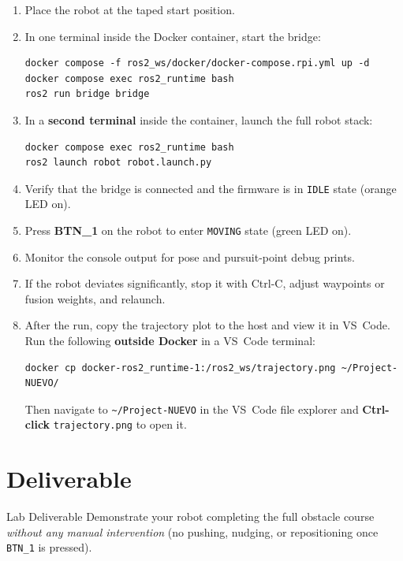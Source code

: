 \documentclass[12pt,letterpaper]{article}
\begin{document}
\begin{enumerate}
  \item Place the robot at the taped start position.
  \item In one terminal inside the Docker container, start the bridge:
\begin{lstlisting}[style=bash]
docker compose -f ros2_ws/docker/docker-compose.rpi.yml up -d
docker compose exec ros2_runtime bash
ros2 run bridge bridge
\end{lstlisting}
  \item In a \textbf{second terminal} inside the container, launch the full
        robot stack:
\begin{lstlisting}[style=bash]
docker compose exec ros2_runtime bash
ros2 launch robot robot.launch.py
\end{lstlisting}
  \item Verify that the bridge is connected and the firmware is in
        \texttt{IDLE} state (orange LED on).
  \item Press \textbf{BTN\_1} on the robot to enter \texttt{MOVING} state
        (green LED on).
  \item Monitor the console output for pose and pursuit-point debug prints.
  \item If the robot deviates significantly, stop it with Ctrl-C, adjust
        waypoints or fusion weights, and relaunch.
  \item After the run, copy the trajectory plot to the host and view it in
        VS~Code.  Run the following \textbf{outside Docker} in a VS~Code
        terminal:
\begin{lstlisting}[style=bash]
docker cp docker-ros2_runtime-1:/ros2_ws/trajectory.png ~/Project-NUEVO/
\end{lstlisting}
        Then navigate to \texttt{\textasciitilde/Project-NUEVO} in the
        VS~Code file explorer and \textbf{Ctrl-click} \texttt{trajectory.png}
        to open it.
\end{enumerate}

\newpage

\section{Deliverable}

\begin{taskbox}{Lab Deliverable}
  Demonstrate your robot completing the full obstacle course \emph{without
  any manual intervention} (no pushing, nudging, or repositioning once
  \texttt{BTN\_1} is pressed).
\end{taskbox}
\end{document}
